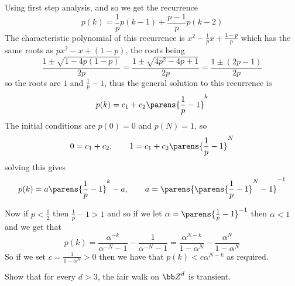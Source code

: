 \eexerc

Using first step analysis,
and so we get the recurrence
$$ p(k) = \frac1pp(k-1) + \frac{p-1}pp(k-2) $$
The characteristic polynomial of this recurrence is $x^2-\frac1px+\frac{1-p}p$ which has the same roots as $px^2-x+(1-p)$, the roots being
$$ \frac{1\pm\sqrt{1-4p(1-p)}}{2p} = \frac{1\pm\sqrt{4p^2-4p+1}}{2p} = \frac{1\pm(2p-1)}{2p} $$
so the roots are $1$ and $\frac1p-1$, thus the general solution to this recurrence is
$$ p(k) = c_1 + c_2\parens{\frac1p-1}^k $$
The initial conditions are $p(0)=0$ and $p(N)=1$, so
$$ 0 = c_1+c_2,\qquad 1 = c_1+c_2\parens{\frac1p-1}^N $$
solving this gives
$$ p(k) = a\parens{\frac1p-1}^k - a,\qquad a=\parens{\parens{\frac1p-1}^N-1}^{-1} $$

Now if $p<\frac12$ then $\frac1p-1>1$ and so if we let $\alpha=\parens{\frac1p-1}^{-1}$ then $\alpha<1$ and we get that
$$ p(k) = \frac{\alpha^{-k}}{\alpha^{-N}-1} - \frac1{\alpha^{-N}-1} = \frac{\alpha^{N-k}}{1-\alpha^N} - \frac{\alpha^N}{1-\alpha^N} $$
So if we set $c=\frac1{1-\alpha^N}>0$ then we have that $p(k)<c\alpha^{N-k}$ as required.

\bexerc

    Show that for every $d>3$, the fair walk on ${\bb Z}^d$ is transient.

\eexerc

